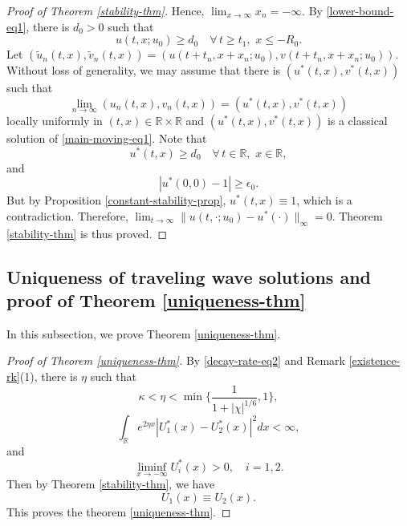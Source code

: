 \documentclass[11pt]{article} %
\theoremstyle{remark}
\theoremstyle{remark}
\numberwithin{equation}{section}
\numberwithin{figure}{section}
\numberwithin{table}{section}
\newcommand\RR{\ensuremath{\mathbb{R}}}
\begin{document}
\begin{proof}[Proof of Theorem \ref{stability-thm}]
Hence,  $\lim_{x\to\infty}x_n=-\infty$. By \eqref{lower-bound-eq1}, there is   $d_0>0$ such that
\begin{equation}
\label{aux-decay-rate-eq2}
u(t,x;u_0)\ge d_0\quad \forall\, t\ge t_1,\,\, x\le -R_0.
\end{equation}
Let $(\tilde u_n(t,x),\tilde v_n(t,x))=(u(t+t_n,x+x_n;u_0),v(t+t_n,x+x_n;u_0))$. Without  loss of generality, we may assume that there is $(u^*(t,x),v^*(t,x))$ such that
$$
\lim_{n\to\infty} (u_n(t,x),v_n(t,x))=(u^*(t,x),v^*(t,x))
$$
locally uniformly in $(t,x)\in\mathbb{R}\times\mathbb{R}$ and $(u^*(t,x),v^*(t,x))$ is a classical solution of \eqref{main-moving-eq1}.
Note that
$$
u^*(t,x)\ge  d_0\quad \forall\, t\in\mathbb{R},\,\, x\in\mathbb{R},
$$
and 
$$
|u^*(0,0)-1|\ge \epsilon_0.
$$
But by Proposition \ref{constant-stability-prop}, $u^*(t,x)\equiv 1$, which is a contradiction.
Therefore, $\lim_{t\to\infty}\|u(t,\cdot;u_0)-u^*(\cdot)\|_\infty=0$. Theorem \ref{stability-thm} is thus proved.
\end{proof}


\subsection{Uniqueness of traveling wave solutions and proof of Theorem \ref{uniqueness-thm}}
\label{ss:uniqueness}



In this subsection, we prove Theorem  \ref{uniqueness-thm}.

\begin{proof}[Proof of Theorem \ref{uniqueness-thm}]
By  \eqref{decay-rate-eq2} and Remark  \ref{existence-rk}(1),  there is $\eta$ such that
$$
\kappa<\eta<\min\{ \frac{1}{1+|\chi|^{1/6}},1\}, 
$$
$$
\int_{\RR} e^{2\eta x} |U_1^*(x)-U_2^*(x)|^2dx<\infty,
$$
and
$$
\liminf_{x\to -\infty} U_i^*(x)>0,\quad i=1,2.
$$
Then by Theorem \ref{stability-thm}, we have
$$
U_1(x)\equiv U_2(x).
$$
This proves the theorem  \ref{uniqueness-thm}.
\end{proof}
\end{document}
